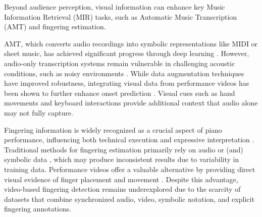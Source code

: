 \documentclass{article}
\begin{document}
Beyond audience perception, visual information can enhance key Music Information Retrieval (MIR) tasks, such as Automatic Music Transcription (AMT) and fingering estimation. 

AMT, which converts audio recordings into symbolic representations like MIDI or sheet music, has achieved significant progress through deep learning \cite{ISMIR18Hawthorne, TASLP21Kong, TASLP24Kwon}. However, audio-only transcription systems remain vulnerable in challenging acoustic conditions, such as noisy environments \cite{ISMIR24Kim}. While data augmentation techniques \cite{ISMIR24Kim, Edwards2024, ICLR19Hawthorne} have improved robustness, integrating visual data from performance videos has been shown to further enhance onset prediction \cite{CJE15Wan, ICASSPW23Li, TASLP24Li}. Visual cues such as hand movements and keyboard interactions provide additional context that audio alone may not fully capture.

Fingering information is widely recognized as a crucial aspect of piano performance, influencing both technical execution and expressive interpretation \cite{Piano21Telles}. Traditional methods for fingering estimation primarily rely on audio or (and) symbolic data \cite{IEAAIE10Maezawa, InfoSci20Nakamura, MM22Ramoneda}, which may produce inconsistent results due to variability in training data. Performance videos offer a valuable alternative by providing direct visual evidence of finger placement and movement \cite{MM07Zhang}. Despite this advantage, video-based fingering detection remains underexplored due to the scarcity of datasets that combine synchronized audio, video, symbolic notation, and explicit fingering annotations.
\end{document}
